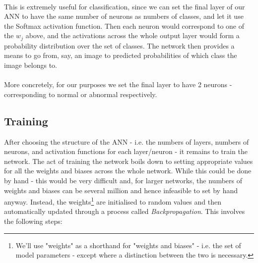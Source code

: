 \documentclass[11pt]{article} %
\theoremstyle{plain}
\theoremstyle{definition}
\begin{document}
\\
\noindent
This is extremely useful for classification, since we can set the final layer of our ANN to have the same number of neurons as numbers of classes, and let it use the Softmax activation function. Then each neuron would correspond to one of the \(w_j\) above, and the activations across the whole output layer would form a probability distribution over the set of classes. The network then provides a means to go from, say, an image to predicted probabilities of which class        the image belongs to. 
\\
\\
\noindent
More concretely, for our purposes we set the final layer to have 2 neurons - corresponding to normal or abnormal respectively.

\newpage
\subsection{Training}
After choosing the structure of the ANN - i.e. the numbers of layers, numbers of neurons, and activation functions for each layer/neuron - it remains to train the network. The act of training the network boils down to setting appropriate values for all the weights and biases across the whole network. While this could be done by hand - this would be very difficult and, for larger networks, the numbers of weights and biases can be several million and hence infeasible to set by hand anyway. Instead, the weights\footnote{We'll use "weights" as a shorthand for "weights and biases" - i.e. the set of model parameters - except where a distinction between the two is necessary.} are initialised to random values and then automatically updated through a process called \textit{Backpropagation}. This involves the following steps:
\end{document}
